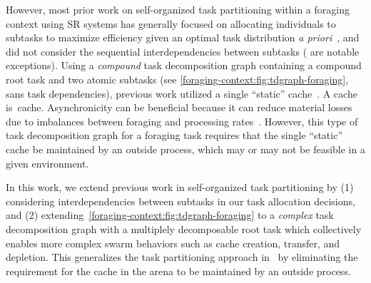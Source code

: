 However, most prior work on self-organized task partitioning within a foraging
context using SR systems has generally focused on allocating individuals to
subtasks to maximize efficiency given an optimal task distribution \emph{a
  priori}~\cite{Correll2008,Berman2009,Matthey2009,Hsieh2008}, and did not
consider the sequential interdependencies between subtasks
(\cite{Pini2011b,Brutschy2014,Ferrante2015,Frison2010,Harwell2018} are notable
exceptions). Using a \emph{compound} task decomposition graph containing a
compound root task and two atomic subtasks (see
\cref{foraging-context:fig:tdgraph-foraging}, sans task dependencies), previous work
utilized a single ``static''
cache~\cite{Pini2011b,Pini2013a,Brutschy2014,Ferrante2015,Frison2010,Harwell2018}.
A \gls{cache} is~\glsdesc{cache}. Asynchronicity can be beneficial because it
can reduce material losses due to imbalances between foraging and processing
rates~\cite{Hart2000}. However, this type of task decomposition graph for a
foraging task requires that the single ``static'' cache be maintained by an
outside process, which may or may not be feasible in a given environment.

In this work, we extend previous work in self-organized task partitioning by (1)
considering interdependencies between subtasks in our task allocation decisions,
and (2) extending~\cref{foraging-context:fig:tdgraph-foraging} to a \emph{complex} task
decomposition graph with a multiplely decomposable root task which collectively
enables more complex swarm behaviors such as cache creation, transfer, and
depletion. This generalizes the task partitioning approach in~\cite{Harwell2018}
by eliminating the requirement for the cache in the arena to be maintained by an
outside process.

